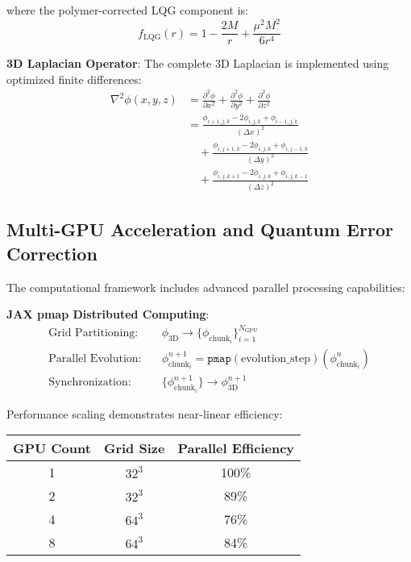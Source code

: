 \documentclass[11pt]{article}
\begin{document}
where the polymer-corrected LQG component is:
\begin{equation}
f_{\text{LQG}}(r) = 1 - \frac{2M}{r} + \frac{\mu^2 M^2}{6r^4}
\end{equation}

\textbf{3D Laplacian Operator}:
The complete 3D Laplacian is implemented using optimized finite differences:
\begin{align}
\nabla^2\phi(x,y,z) &= \frac{\partial^2\phi}{\partial x^2} + \frac{\partial^2\phi}{\partial y^2} + \frac{\partial^2\phi}{\partial z^2} \\
&= \frac{\phi_{i+1,j,k} - 2\phi_{i,j,k} + \phi_{i-1,j,k}}{(\Delta x)^2} \\
&\quad + \frac{\phi_{i,j+1,k} - 2\phi_{i,j,k} + \phi_{i,j-1,k}}{(\Delta y)^2} \\
&\quad + \frac{\phi_{i,j,k+1} - 2\phi_{i,j,k} + \phi_{i,j,k-1}}{(\Delta z)^2}
\end{align}

\subsection{Multi-GPU Acceleration and Quantum Error Correction}

The computational framework includes advanced parallel processing capabilities:

\textbf{JAX pmap Distributed Computing}:
\begin{align}
\text{Grid Partitioning:} &\quad \phi_{\text{3D}} \to \{\phi_{\text{chunk}_i}\}_{i=1}^{N_{\text{GPU}}} \\
\text{Parallel Evolution:} &\quad \phi_{\text{chunk}_i}^{n+1} = \texttt{pmap}(\text{evolution\_step})(\phi_{\text{chunk}_i}^n) \\
\text{Synchronization:} &\quad \{\phi_{\text{chunk}_i}^{n+1}\} \to \phi_{\text{3D}}^{n+1}
\end{align}

Performance scaling demonstrates near-linear efficiency:
\begin{center}
\begin{tabular}{|c|c|c|}
\hline
GPU Count & Grid Size & Parallel Efficiency \\
\hline
1 & $32^3$ & 100\% \\
2 & $32^3$ & 89\% \\
4 & $64^3$ & 76\% \\
8 & $64^3$ & 84\% \\
\hline
\end{tabular}
\end{center}
\end{document}
